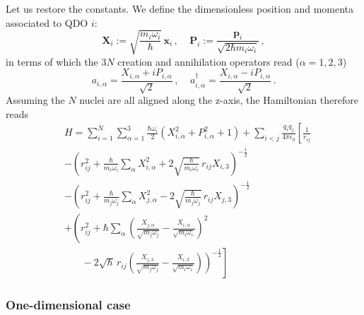 \documentclass[reprint, amsmath, amssymb, aps]{revtex4-2}
\begin{document}
                Let us restore the constants. We define the dimensionless position and momenta associated to QDO $i$:
                \begin{equation}
                    \bm{X}_i := \sqrt{\frac{m_i\omega_i}{\hbar}}\,\bm{x}_i\,,\ \ \ \ \ \bm{P}_i := \frac{\bm{p}_i}{\sqrt{2\hbar m_i\omega_i}}\,,
                \end{equation}
                in terms of which the $3N$ creation and annihilation operators read ($\alpha=1,2,3$)
                \begin{equation}
                    a_{i,\alpha} = \frac{X_{i,\alpha} + iP_{i,\alpha}}{\sqrt 2}\,,\ \ \ \ \ a^\dagger_{i,\alpha} = \frac{X_{i,\alpha} - iP_{i,\alpha}}{\sqrt 2}\,.
                \end{equation}
                Assuming the $N$ nuclei are all aligned along the z-axis, the Hamiltonian therefore reads
                \begin{equation}
                \begin{split}
                    & H = \sum_{i=1}^N\sum_{\alpha=1}^3\frac{\hbar\omega_i}{2}\left(X_{i,\alpha}^2 + P_{i,\alpha}^2 + 1\right)  + \sum_{i < j}\frac{q_iq_j}{4\pi\epsilon_0}\left[\frac{1}{r_{ij}}\right.\\
                    &-\left(r_{ij}^2 + \frac{\hbar}{m_i\omega_i}\sum_{\alpha}X_{i,\alpha}^2 +2\sqrt{\frac{\hbar}{m_i\omega_i}}\,r_{ij}X_{i,3}\right)^{-\frac{1}{2}}\\
                    &-\left(r_{ij}^2 + \frac{\hbar}{m_j\omega_j}\sum_{\alpha}X_{j,\alpha}^2 -2\sqrt{\frac{\hbar}{m_j\omega_j}}\,r_{ij}X_{j,3}\right)^{-\frac{1}{2}}\\
                    &+\left(r_{ij}^2+\hbar\sum_{\alpha}\left(\frac{X_{j,\alpha}}{\sqrt{m_j\omega_j}}-\frac{X_{i,\alpha}}{\sqrt{m_i\omega_i}}\right)^2\right.\\
                    &\left.\left.\ \ \ \ \ \ \ \ -2\sqrt{\hbar}\,r_{ij}\left(\frac{X_{j,3}}{\sqrt{m_j\omega_j}}-\frac{X_{i,3}}{\sqrt{m_i\omega_i}}\right)\right)^{-\frac{1}{2}}\right]
                \end{split}
                \end{equation}

            \subsubsection{One-dimensional case}
\end{document}
